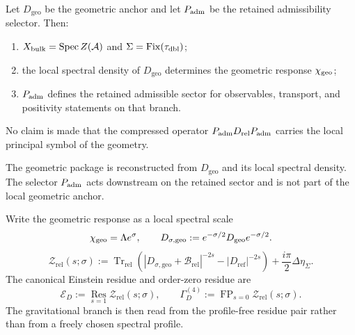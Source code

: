 \begin{theorem}
\label{thm:retained-branch-from-Padm}
\label{thm:admissible-sector-on-reconstructed-geometry}
\label{thm:full-operator-reconstruction}
Let $D_{\mathrm{geo}}$ be the geometric anchor and let $P_{\mathrm{adm}}$ be the retained
admissibility selector.
Then:
\begin{enumerate}[label=(\roman*), leftmargin=1.5em, topsep=3pt, itemsep=2pt]
\item $X_{\mathrm{bulk}}=\mathrm{Spec}\,Z(\mathcal A)$ and $\Sigma=\mathrm{Fix}(\tau_{\mathrm{dbl}})$;
\item the local spectral density of $D_{\mathrm{geo}}$ determines the geometric response
      $\chi_{\mathrm{geo}}$;
\item $P_{\mathrm{adm}}$ defines the retained admissible sector for observables, transport,
      and positivity statements on that branch.
\end{enumerate}
No claim is made that the compressed operator $P_{\mathrm{adm}} D_{\mathrm{rel}}P_{\mathrm{adm}}$
carries the local principal symbol of the geometry.
\end{theorem}

\begin{corollary}
The geometric package is reconstructed from $D_{\mathrm{geo}}$ and its local spectral density.
The selector $P_{\mathrm{adm}}$ acts downstream on the retained sector and is not part of the
local geometric anchor.
\end{corollary}

\begin{definition}
\label{def:local-spectral-scale}
\label{def:canonical-residues}
Write the geometric response as a local spectral scale
\[
\chi_{\mathrm{geo}}=\Lambda e^\sigma,
\qquad
D_{\sigma,\mathrm{geo}}:=e^{-\sigma/2}D_{\mathrm{geo}}e^{-\sigma/2}.
\]
\[
\mathcal Z_{\mathrm{rel}}(s;\sigma)
:=
\operatorname{Tr}_{\mathrm{rel}}\!\left(
|D_{\sigma,\mathrm{geo}}+\mathcal B_{\mathrm{rel}}|^{-2s}
-|D_{\mathrm{ref}}|^{-2s}
\right)
+\frac{i\pi}{2}\Delta\eta_\Sigma.
\]
The canonical Einstein residue and order-zero residue are
\[
\mathcal E_D
:=
\operatorname*{Res}_{s=1}\mathcal Z_{\mathrm{rel}}(s;\sigma),
\qquad
\Gamma_D^{(4)}
:=
\operatorname{FP}_{s=0}\mathcal Z_{\mathrm{rel}}(s;\sigma).
\]
The gravitational branch is then read from the profile-free residue pair rather than from a freely
chosen spectral profile.
\end{definition}


